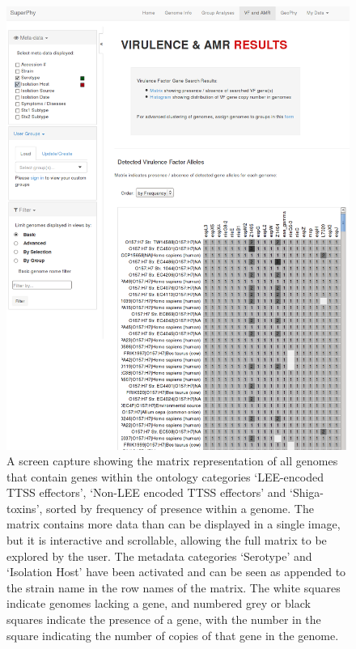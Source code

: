 \documentclass[doublespacing, linenumbers]{bmcart}
\begin{document}
\begin{backmatter}
\newpage
\begin{figure}[h!]
  \includegraphics[width=1\columnwidth]{images/vf_output.png}
  \caption{A screen capture showing the matrix representation of all genomes that contain genes within the ontology categories `LEE-encoded TTSS effectors', `Non-LEE encoded TTSS effectors' and `Shiga-toxins', sorted by frequency of presence within a genome. The matrix contains more data than can be displayed in a single image, but it is interactive and scrollable, allowing the full matrix to be explored by the user. The metadata categories `Serotype' and `Isolation Host' have been activated and can be seen as appended to the strain name in the row names of the matrix. The white squares indicate genomes lacking a gene, and numbered grey or black squares indicate the presence of a gene, with the number in the square indicating the number of copies of that gene in the genome.}
  \label{fig:vf_output}
\end{figure}



\end{backmatter}
\end{document}
